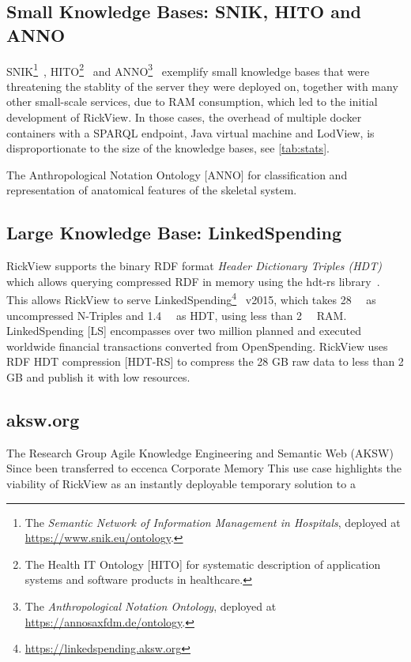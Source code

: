 \documentclass{ceurart}
\begin{document}
\subsection{Small Knowledge Bases: SNIK, HITO and ANNO}
SNIK\footnote{The \emph{Semantic Network of Information Management in Hospitals}, deployed at \url{https://www.snik.eu/ontology}.}~\citep{snik},
HITO\footnote{The Health IT Ontology [HITO] for systematic description of application systems and software products in healthcare.}~\citep{hito}
and ANNO\footnote{The \emph{Anthropological Notation Ontology}, deployed at \url{https://annosaxfdm.de/ontology}.}~\citep{anno}
exemplify small knowledge bases that were threatening the stablity of the server they were deployed on, together with many other small-scale services, due to RAM consumption, which led to the initial development of RickView.
In those cases, the overhead of multiple docker containers with a SPARQL endpoint, Java virtual machine and LodView, is disproportionate to the size of the knowledge bases, see \cref{tab:stats}.

The Anthropological Notation Ontology [ANNO] for classification and representation of anatomical features of the skeletal system.

\subsection{Large Knowledge Base: LinkedSpending}
RickView supports the binary RDF format \emph{Header Dictionary Triples (HDT)}~\citep{hdt2012} which allows querying compressed RDF in memory using the hdt-rs library~\citep{hdtrs}.
This allows RickView to serve LinkedSpending\footnote{\url{https://linkedspending.aksw.org}}~\citep{linkedspending} v2015, which takes \SI{28}{\giga\byte} as uncompressed N-Triples and \SI{1.4}{\giga\byte} as HDT, using less than \SI{2}{\giga\byte} RAM.
LinkedSpending [LS] encompasses over two million planned and executed worldwide financial transactions converted from OpenSpending. RickView uses RDF HDT compression [HDT-RS] to compress the 28 GB raw data to less than 2 GB and publish it with low resources.

\citep{linkedspending}
\citep{hdt}

\subsection{aksw.org}
The Research Group Agile Knowledge Engineering and Semantic Web (AKSW) 
Since been transferred to eccenca Corporate Memory
This use case highlights the viability of RickView as an instantly deployable temporary solution to a 
\end{document}
